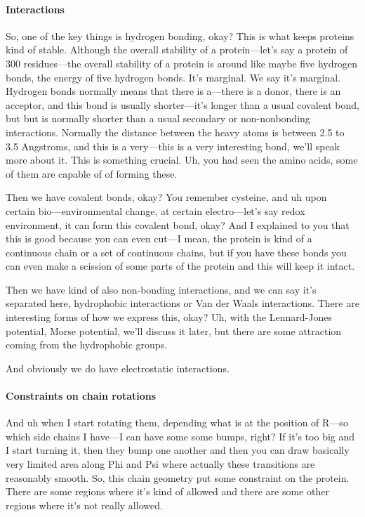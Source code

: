 \paragraph{Interactions}
So, one of the key things is hydrogen bonding, okay? This is what keeps proteins kind of stable. Although the overall stability of a protein—let’s say a protein of 300 residues—the overall stability of a protein is around like maybe five hydrogen bonds, the energy of five hydrogen bonds. It's marginal. We say it's marginal.
Hydrogen bonds normally means that there is a—there is a donor, there is an acceptor, and this bond is usually shorter—it’s longer than a usual covalent bond, but but is normally shorter than a usual secondary or non-nonbonding interactions. Normally the distance between the heavy atoms is between 2.5 to 3.5 Angstroms, and this is a very—this is a very interesting bond, we’ll speak more about it. This is something crucial. Uh, you had seen the amino acids, some of them are capable of of forming these.

Then we have covalent bonds, okay? You remember cysteine, and uh upon certain bio—environmental change, at certain electro—let's say redox environment, it can form this covalent bond, okay? And I explained to you that this is good because you can even cut—I mean, the protein is kind of a continuous chain or a set of continuous chains, but if you have these bonds you can even make a scission of some parts of the protein and this will keep it intact.

Then we have kind of also non-bonding interactions, and we can say it's separated here, hydrophobic interactions or Van der Waals interactions. There are interesting forms of how we express this, okay? Uh, with the Lennard-Jones potential, Morse potential, we'll discuss it later, but there are some attraction coming from the hydrophobic groups.

And obviously we do have electrostatic interactions.

\paragraph{Constraints on chain rotations}
And uh when I start rotating them, depending what is at the position of R—so which side chains I have—I can have some some bumps, right? If it's too big and I start turning it, then they bump one another and then you can draw basically very limited area along Phi and Psi where actually these transitions are reasonably smooth. So, this chain geometry put some constraint on the protein. There are some regions where it's kind of allowed and there are some other regions where it's not really allowed.

